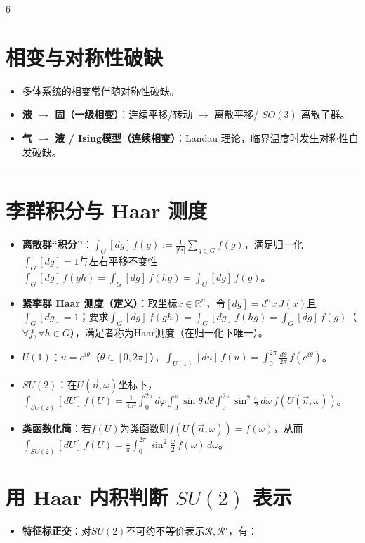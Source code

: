 \documentclass[landscape]{article}
\begin{document}
\begin{multicols*}{6}
\section*{相变与对称性破缺}
\begin{itemize}
  \item 多体系统的相变常伴随对称性破缺。
  \item \textbf{液 $\to$ 固（一级相变）}：连续平移/转动 $\to$ 离散平移/ $SO(3)$ 离散子群。
  \item \textbf{气 $\to$ 液 / Ising模型（连续相变）}：Landau 理论，临界温度时发生对称性自发破缺。
\end{itemize}
\noindent\textcolor{blue}{\rule{\linewidth}{1pt}}
\section*{李群积分与 Haar 测度}
\begin{itemize}
  \item \textbf{离散群“积分”}：$\int_G[dg]\,f(g):=\frac{1}{|G|}\sum_{g\in G}f(g)$，满足归一化$\int_G[dg]=1$与左右平移不变性$\int_G[dg]\,f(gh)=\int_G[dg]\,f(hg)=\int_G[dg]\,f(g)$。
  \item \textbf{紧李群 Haar 测度（定义）}：取坐标$x\in\mathbb{R}^n$，令$[dg]=d^n x\,J(x)$且$\int_G[dg]=1$；要求$\int_G[dg]\,f(gh)=\int_G[dg]\,f(hg)=\int_G[dg]\,f(g)$（$\forall f,\forall h\in G$），满足者称为Haar测度（在归一化下唯一）。
  \item \textbf{$U(1)$}：$u=e^{i\theta}$（$\theta\in[0,2\pi]$），$\int_{U(1)}[du]\,f(u)=\int_0^{2\pi}\frac{d\theta}{2\pi}\,f(e^{i\theta})$。
  \item \textbf{$SU(2)$}：在$U(\vec n,\omega)$坐标下，
  $\int_{SU(2)}[dU]\,f(U)=\frac{1}{4\pi^2}\int_0^{2\pi}d\varphi\int_0^\pi\sin\theta\,d\theta\int_0^{2\pi}\sin^2\frac{\omega}{2}\,d\omega\,f(U(\vec n,\omega))$。
  \item \textbf{类函数化简}：若$f(U)$为类函数则$f(U(\vec n,\omega))=f(\omega)$，从而$\int_{SU(2)}[dU]\,f(U)=\frac{1}{\pi}\int_0^{2\pi}\sin^2\frac{\omega}{2}\,f(\omega)\,d\omega$。
\end{itemize}

\section*{用 Haar 内积判断 $SU(2)$ 表示}
\begin{itemize}
  \item \textbf{特征标正交}：对$SU(2)$不可约不等价表示$\mathcal R,\mathcal R'$，有：
  

\end{itemize}
\end{multicols*}
\end{document}
